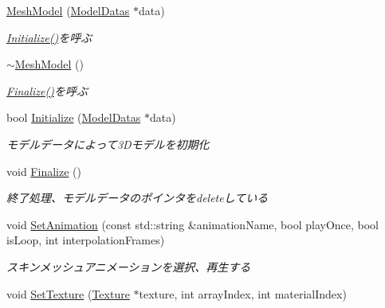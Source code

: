 \begin{DoxyCompactItemize}
\item 
\mbox{\hyperlink{class_k___graphics_1_1_mesh_model_ab7ba0ef09b7548369c64fa306a017763}{Mesh\+Model}} (\mbox{\hyperlink{struct_k___graphics_1_1_model_datas}{Model\+Datas}} $\ast$data)
\begin{DoxyCompactList}\small\item\em \mbox{\hyperlink{class_k___graphics_1_1_mesh_model_a637186b0c2c238605024c1ac04b74fa5}{Initialize()}}を呼ぶ \end{DoxyCompactList}\item 
\mbox{\hyperlink{class_k___graphics_1_1_mesh_model_a1cad4b0768077d36ab31fdfdff1e3e61}{$\sim$\+Mesh\+Model}} ()
\begin{DoxyCompactList}\small\item\em \mbox{\hyperlink{class_k___graphics_1_1_mesh_model_a22ec15af1fc136d17ef87293acc1e4a7}{Finalize()}}を呼ぶ \end{DoxyCompactList}\item 
bool \mbox{\hyperlink{class_k___graphics_1_1_mesh_model_a637186b0c2c238605024c1ac04b74fa5}{Initialize}} (\mbox{\hyperlink{struct_k___graphics_1_1_model_datas}{Model\+Datas}} $\ast$data)
\begin{DoxyCompactList}\small\item\em モデルデータによって3\+Dモデルを初期化 \end{DoxyCompactList}\item 
void \mbox{\hyperlink{class_k___graphics_1_1_mesh_model_a22ec15af1fc136d17ef87293acc1e4a7}{Finalize}} ()
\begin{DoxyCompactList}\small\item\em 終了処理、モデルデータのポインタをdeleteしている \end{DoxyCompactList}\item 
void \mbox{\hyperlink{class_k___graphics_1_1_mesh_model_afd9c3efeb690b8acd03a83aa8382f22c}{Set\+Animation}} (const std\+::string \&animation\+Name, bool play\+Once, bool is\+Loop, int interpolation\+Frames)
\begin{DoxyCompactList}\small\item\em スキンメッシュアニメーションを選択、再生する \end{DoxyCompactList}\item 
void \mbox{\hyperlink{class_k___graphics_1_1_mesh_model_a35917ca955acf2d980790c1e5b51b01d}{Set\+Texture}} (\mbox{\hyperlink{class_k___graphics_1_1_texture}{Texture}} $\ast$texture, int array\+Index, int material\+Index)

\end{DoxyCompactItemize}
